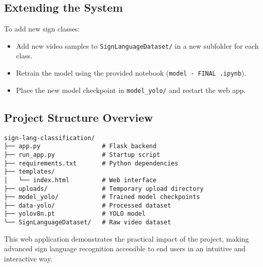 \documentclass[11pt, a4paper]{article}
\begin{document}
\subsection{Extending the System}
To add new sign classes:
\begin{itemize}
    \item Add new video samples to \texttt{SignLanguageDataset/} in a new subfolder for each class.
    \item Retrain the model using the provided notebook (\texttt{model - FINAL .ipynb}).
    \item Place the new model checkpoint in \texttt{model\_yolo/} and restart the web app.
\end{itemize}

\subsection{Project Structure Overview}
\begin{verbatim}
sign-lang-classification/
├── app.py                 # Flask backend
├── run_app.py             # Startup script
├── requirements.txt       # Python dependencies
├── templates/
│   └── index.html         # Web interface
├── uploads/               # Temporary upload directory
├── model_yolo/            # Trained model checkpoints
├── data-yolo/             # Processed dataset
├── yolov8n.pt             # YOLO model
└── SignLanguageDataset/   # Raw video dataset
\end{verbatim}

This web application demonstrates the practical impact of the project, making advanced sign language recognition accessible to end users in an intuitive and interactive way.




\end{document}

